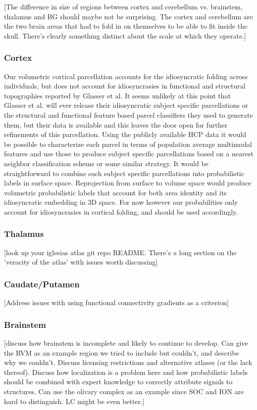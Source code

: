 \documentclass[10pt,letterpaper]{article}
\begin{document}
[The difference in size of regions between cortex and cerebellum vs. brainstem, thalamus and BG should maybe not be surprising. The cortex and cerebellum are the two brain areas that had to fold in on themselves to be able to fit inside the skull. There's clearly something distinct about the scale at which they operate.]

\subsubsection{Cortex} Our volumetric cortical parcellation accounts for the idiosyncratic folding across individuals, but does not account for idiosyncrasies in functional and structural topographies reported by Glasser et al. It seems unlikely at this point that Glasser et al. will ever release their idiosyncratic subject specific parcellations or the structural and functional feature based parcel classifiers they used to generate them, but their data is available and this leaves the door open for further refinements of this parcellation. Using the publicly available HCP data it would be possible to characterize each parcel in terms of population average multimodal features and use those to produce subject specific parcellations based on a nearest neighbor classification scheme or some similar strategy. It would be straightforward to combine such subject specific parcellations into probabilistic labels in surface space. Reprojection from surface to volume space would produce volumetric probabilistic labels that account for both area identity and its idiosyncratic embedding in 3D space. For now however our probabilities only account for idiosyncrasies in cortical folding, and should be used accordingly.

\subsubsection{Thalamus} [look up your iglesias atlas git repo README. There's a long section on the 'veracity of the atlas' with issues worth discussing]

\subsubsection{Caudate/Putamen} [Address issues with using functional connectivity gradients as a criterion]

\subsubsection{Brainstem} [discuss how brainstem is incomplete and likely to continue to develop. Can give the RVM as an example region we tried to include but couldn't, and describe why we couldn't. Discuss licensing restrictions and alternative atlases (or the lack thereof). Discuss how localization is a problem here and how probabilistic labels should be combined with expert knowledge to correctly attribute signals to structures. Can use the olivary complex as an example since SOC and ION are hard to distinguish. LC might be even better.]
\end{document}
